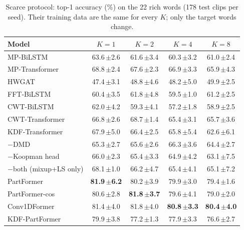 \begin{table}[t]
\centering
\small
\caption{Scarce protocol: top-1 accuracy (\%) on the 22 rich words (178 test clips per seed). Their training data are the same for every $K$; only the target words change.}
\label{tab:rich}
\begin{tabular}{lcccc}
\toprule
Model & $K=1$ & $K=2$ & $K=4$ & $K=8$ \\
\midrule
MP-BiLSTM & 63.6\,{\scriptsize$\pm$2.6} & 61.6\,{\scriptsize$\pm$3.4} & 60.3\,{\scriptsize$\pm$3.2} & 61.0\,{\scriptsize$\pm$2.4} \\
MP-Transformer & 68.8\,{\scriptsize$\pm$2.4} & 67.6\,{\scriptsize$\pm$2.3} & 66.9\,{\scriptsize$\pm$3.3} & 65.9\,{\scriptsize$\pm$4.3} \\
\midrule
HWGAT & 47.4\,{\scriptsize$\pm$3.1} & 48.8\,{\scriptsize$\pm$4.6} & 48.2\,{\scriptsize$\pm$5.0} & 49.9\,{\scriptsize$\pm$2.5} \\
\midrule
FFT-BiLSTM & 60.4\,{\scriptsize$\pm$3.5} & 61.8\,{\scriptsize$\pm$4.8} & 59.5\,{\scriptsize$\pm$1.0} & 61.2\,{\scriptsize$\pm$2.5} \\
CWT-BiLSTM & 62.0\,{\scriptsize$\pm$4.2} & 59.3\,{\scriptsize$\pm$4.1} & 57.2\,{\scriptsize$\pm$1.8} & 58.9\,{\scriptsize$\pm$2.5} \\
CWT-Transformer & 66.8\,{\scriptsize$\pm$2.6} & 68.7\,{\scriptsize$\pm$1.4} & 65.4\,{\scriptsize$\pm$3.1} & 65.7\,{\scriptsize$\pm$3.6} \\
\midrule
KDF-Transformer & 67.9\,{\scriptsize$\pm$5.0} & 66.4\,{\scriptsize$\pm$2.5} & 65.8\,{\scriptsize$\pm$5.4} & 62.6\,{\scriptsize$\pm$6.1} \\
\quad $-$DMD & 65.3\,{\scriptsize$\pm$2.7} & 65.6\,{\scriptsize$\pm$2.6} & 66.3\,{\scriptsize$\pm$3.6} & 64.4\,{\scriptsize$\pm$2.7} \\
\quad $-$Koopman head & 66.0\,{\scriptsize$\pm$2.3} & 65.4\,{\scriptsize$\pm$3.3} & 64.9\,{\scriptsize$\pm$4.2} & 63.1\,{\scriptsize$\pm$7.5} \\
\quad $-$both (mixup+LS only) & 68.1\,{\scriptsize$\pm$1.0} & 66.2\,{\scriptsize$\pm$4.7} & 65.4\,{\scriptsize$\pm$4.1} & 65.1\,{\scriptsize$\pm$7.2} \\
\midrule
PartFormer & \textbf{81.9\,{\scriptsize$\pm$6.2}} & 80.2\,{\scriptsize$\pm$3.9} & 79.9\,{\scriptsize$\pm$3.0} & 79.4\,{\scriptsize$\pm$1.6} \\
PartFormer-cos & 80.6\,{\scriptsize$\pm$2.8} & \textbf{81.8\,{\scriptsize$\pm$3.7}} & 79.6\,{\scriptsize$\pm$4.1} & 79.0\,{\scriptsize$\pm$2.0} \\
Conv1DFormer & 81.4\,{\scriptsize$\pm$4.0} & 81.8\,{\scriptsize$\pm$4.0} & \textbf{80.8\,{\scriptsize$\pm$3.3}} & \textbf{80.4\,{\scriptsize$\pm$4.0}} \\
KDF-PartFormer & 79.9\,{\scriptsize$\pm$3.8} & 77.2\,{\scriptsize$\pm$1.3} & 77.9\,{\scriptsize$\pm$3.3} & 76.6\,{\scriptsize$\pm$2.7} \\
\bottomrule
\end{tabular}
\end{table}
